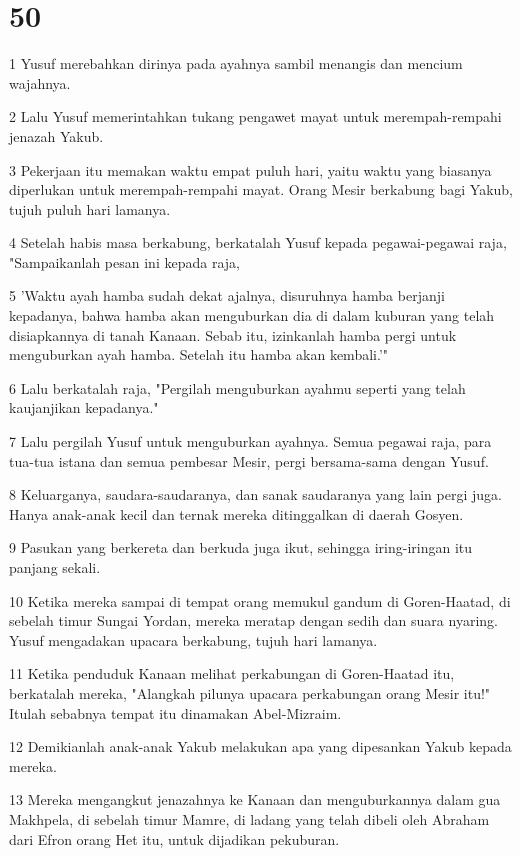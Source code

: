 \chapter{50}

\par 1 Yusuf merebahkan dirinya pada ayahnya sambil menangis dan mencium wajahnya.
\par 2 Lalu Yusuf memerintahkan tukang pengawet mayat untuk merempah-rempahi jenazah Yakub.
\par 3 Pekerjaan itu memakan waktu empat puluh hari, yaitu waktu yang biasanya diperlukan untuk merempah-rempahi mayat. Orang Mesir berkabung bagi Yakub, tujuh puluh hari lamanya.
\par 4 Setelah habis masa berkabung, berkatalah Yusuf kepada pegawai-pegawai raja, "Sampaikanlah pesan ini kepada raja,
\par 5 'Waktu ayah hamba sudah dekat ajalnya, disuruhnya hamba berjanji kepadanya, bahwa hamba akan menguburkan dia di dalam kuburan yang telah disiapkannya di tanah Kanaan. Sebab itu, izinkanlah hamba pergi untuk menguburkan ayah hamba. Setelah itu hamba akan kembali.'"
\par 6 Lalu berkatalah raja, "Pergilah menguburkan ayahmu seperti yang telah kaujanjikan kepadanya."
\par 7 Lalu pergilah Yusuf untuk menguburkan ayahnya. Semua pegawai raja, para tua-tua istana dan semua pembesar Mesir, pergi bersama-sama dengan Yusuf.
\par 8 Keluarganya, saudara-saudaranya, dan sanak saudaranya yang lain pergi juga. Hanya anak-anak kecil dan ternak mereka ditinggalkan di daerah Gosyen.
\par 9 Pasukan yang berkereta dan berkuda juga ikut, sehingga iring-iringan itu panjang sekali.
\par 10 Ketika mereka sampai di tempat orang memukul gandum di Goren-Haatad, di sebelah timur Sungai Yordan, mereka meratap dengan sedih dan suara nyaring. Yusuf mengadakan upacara berkabung, tujuh hari lamanya.
\par 11 Ketika penduduk Kanaan melihat perkabungan di Goren-Haatad itu, berkatalah mereka, "Alangkah pilunya upacara perkabungan orang Mesir itu!" Itulah sebabnya tempat itu dinamakan Abel-Mizraim.
\par 12 Demikianlah anak-anak Yakub melakukan apa yang dipesankan Yakub kepada mereka.
\par 13 Mereka mengangkut jenazahnya ke Kanaan dan menguburkannya dalam gua Makhpela, di sebelah timur Mamre, di ladang yang telah dibeli oleh Abraham dari Efron orang Het itu, untuk dijadikan pekuburan.
